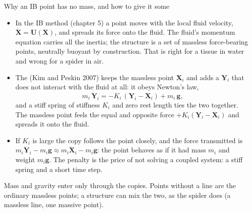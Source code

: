 \documentclass[aspectratio=169,11pt]{beamer}
\begin{document}
\begin{frame}{Why an IB point has no mass, and how to give it some}
\label{fr:why}
\small
\begin{itemize}
  \item In the IB method (chapter 5) a point moves with the local fluid velocity, $\dot{\mathbf{X}} = \mathbf{U}(\mathbf{X})$, and spreads its force onto the fluid. The fluid's momentum equation carries all the inertia; the structure is a set of massless force-bearing points, neutrally buoyant by construction. That is right for a tissue in water and wrong for a spider in air.
  \item The  (Kim and Peskin 2007) keeps the massless point $\mathbf{X}_i$ and adds a  $\mathbf{Y}_i$ that does not interact with the fluid at all: it obeys Newton's law,
  \[
    m_i\,\ddot{\mathbf{Y}}_i = -K_i\,(\mathbf{Y}_i - \mathbf{X}_i) + m_i\,\mathbf{g},
  \]
  and a stiff spring of stiffness $K_i$ and zero rest length ties the two together. The massless point feels the equal and opposite force $+K_i(\mathbf{Y}_i - \mathbf{X}_i)$ and spreads it onto the fluid.
  \item If $K_i$ is large the copy follows the point closely, and the force transmitted is $m_i\ddot{\mathbf{Y}}_i - m_i\mathbf{g} \approx m_i\ddot{\mathbf{X}}_i - m_i\mathbf{g}$: the point behaves as if it had mass $m_i$ and weight $m_i\mathbf{g}$. The penalty is the price of not solving a coupled system: a stiff spring and a short time step.
\end{itemize}
\begin{punchbox}
\footnotesize Mass and gravity enter only through the copies. Points without a  line are the ordinary massless points; a structure can mix the two, as the spider does (a massless line, one massive point).
\end{punchbox}
\end{frame}
\end{document}
